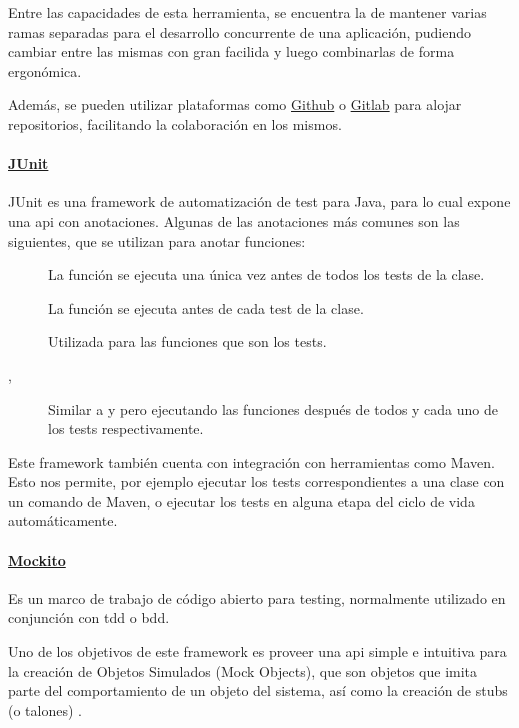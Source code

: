 Entre las capacidades de esta herramienta, se encuentra la de mantener varias ramas separadas para el desarrollo concurrente de una aplicación, pudiendo cambiar entre las mismas con gran facilida y luego combinarlas de forma ergonómica.

Además, se pueden utilizar plataformas como \href{https://github.com/}{Github} o \href{https://gitlab.com/}{Gitlab} para alojar repositorios, facilitando la colaboración en los mismos.

\paragraph{\href{https://junit.org/}{JUnit}}\label{para:junit}
JUnit es una framework de automatización de test para Java, para lo cual expone una api con anotaciones. Algunas de las anotaciones más comunes son las siguientes, que se utilizan para anotar funciones:
\begin{description}
    \item[] La función se ejecuta una única vez antes de todos los tests de la clase.
    \item[] La función se ejecuta antes de cada test de la clase.
    \item[] Utilizada para las funciones que son los tests.
    \item[, ] Similar a  y  pero ejecutando las funciones después de todos y cada uno de los tests respectivamente.
\end{description}

Este framework también cuenta con integración con herramientas como Maven. Esto nos permite, por ejemplo ejecutar los tests correspondientes a una clase con un comando de Maven, o ejecutar los tests en alguna etapa del ciclo de vida automáticamente.

\paragraph{\href{https://site.mockito.org/}{Mockito}}\label{para:mockito}
Es un marco de trabajo de código abierto para testing, normalmente utilizado en conjunción con \acrfull{tdd} o \acrfull{bdd}.

Uno de los objetivos de este framework es proveer una \acrfull{api} simple e intuitiva para la creación de Objetos Simulados (Mock Objects), que son objetos que imita parte del comportamiento de un objeto del sistema, así como la creación de stubs (o talones) \cite{mockitoFeatures}.

